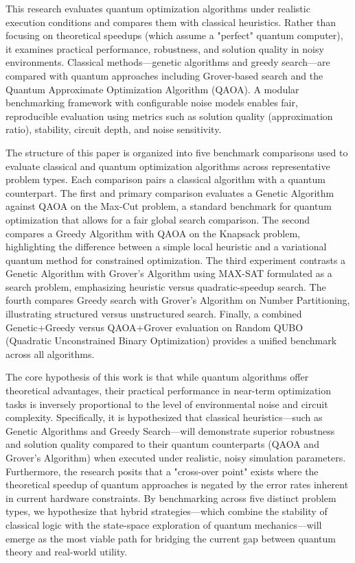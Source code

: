 \documentclass[12pt]{article}
\begin{document}
This research evaluates quantum optimization algorithms under realistic execution conditions and compares them with classical heuristics. Rather than focusing on theoretical speedups (which assume a "perfect" quantum computer), it examines practical performance, robustness, and solution quality in noisy environments. Classical methods—genetic algorithms and greedy search—are compared with quantum approaches including Grover-based search and the Quantum Approximate Optimization Algorithm (QAOA). A modular benchmarking framework with configurable noise models enables fair, reproducible evaluation using metrics such as solution quality (approximation ratio), stability, circuit depth, and noise sensitivity.

The structure of this paper is organized into five benchmark comparisons used to evaluate classical and quantum optimization algorithms across representative problem types. Each comparison pairs a classical algorithm with a quantum counterpart. The first and primary comparison evaluates a Genetic Algorithm against QAOA on the Max-Cut problem, a standard benchmark for quantum optimization that allows for a fair global search comparison. The second compares a Greedy Algorithm with QAOA on the Knapsack problem, highlighting the difference between a simple local heuristic and a variational quantum method for constrained optimization. The third experiment contrasts a Genetic Algorithm with Grover’s Algorithm using MAX-SAT formulated as a search problem, emphasizing heuristic versus quadratic-speedup search. The fourth compares Greedy search with Grover’s Algorithm on Number Partitioning, illustrating structured versus unstructured search. Finally, a combined Genetic+Greedy versus QAOA+Grover evaluation on Random QUBO (Quadratic Unconstrained Binary Optimization) provides a unified benchmark across all algorithms.

The core hypothesis of this work is that while quantum algorithms offer theoretical advantages, their practical performance in near-term optimization tasks is inversely proportional to the level of environmental noise and circuit complexity. Specifically, it is hypothesized that classical heuristics—such as Genetic Algorithms and Greedy Search—will demonstrate superior robustness and solution quality compared to their quantum counterparts (QAOA and Grover’s Algorithm) when executed under realistic, noisy simulation parameters. Furthermore, the research posits that a "cross-over point" exists where the theoretical speedup of quantum approaches is negated by the error rates inherent in current hardware constraints. By benchmarking across five distinct problem types, we hypothesize that hybrid strategies—which combine the stability of classical logic with the state-space exploration of quantum mechanics—will emerge as the most viable path for bridging the current gap between quantum theory and real-world utility.
\end{document}

